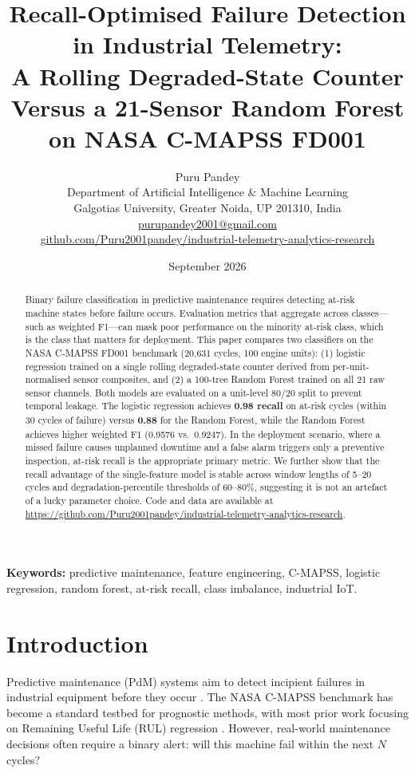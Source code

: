 \documentclass[10pt,twocolumn]{article}
\title{\textbf{Recall-Optimised Failure Detection in Industrial Telemetry:}\\
\textbf{A Rolling Degraded-State Counter Versus a 21-Sensor Random Forest}\\
\textbf{on NASA C-MAPSS FD001}}
\author{Puru Pandey\\
\small Department of Artificial Intelligence \& Machine Learning\\
\small Galgotias University, Greater Noida, UP 201310, India\\
\small \href{mailto:purupandey2001@gmail.com}{purupandey2001@gmail.com}\\
\small \href{https://github.com/Puru2001pandey/industrial-telemetry-analytics-research}{github.com/Puru2001pandey/industrial-telemetry-analytics-research}}
\date{September 2026}
\begin{document}
\maketitle
\thispagestyle{fancy}

\begin{abstract}
Binary failure classification in predictive maintenance requires detecting at-risk
machine states before failure occurs.
Evaluation metrics that aggregate across classes---such as weighted F1---can mask poor
performance on the minority at-risk class, which is the class that matters for
deployment.
This paper compares two classifiers on the NASA C-MAPSS FD001 benchmark (20,631 cycles,
100 engine units): (1) logistic regression trained on a single rolling degraded-state
counter derived from per-unit-normalised sensor composites, and (2) a 100-tree Random
Forest trained on all 21 raw sensor channels.
Both models are evaluated on a unit-level 80/20 split to prevent temporal leakage.
The logistic regression achieves \textbf{0.98 recall} on at-risk cycles (within 30
cycles of failure) versus \textbf{0.88} for the Random Forest, while the Random Forest
achieves higher weighted F1 (0.9576 vs.\ 0.9247).
In the deployment scenario, where a missed failure causes unplanned downtime and a
false alarm triggers only a preventive inspection, at-risk recall is the appropriate
primary metric.
We further show that the recall advantage of the single-feature model is stable across
window lengths of 5--20 cycles and degradation-percentile thresholds of 60--80\%,
suggesting it is not an artefact of a lucky parameter choice.
Code and data are available at
\url{https://github.com/Puru2001pandey/industrial-telemetry-analytics-research}.
\end{abstract}

\noindent\textbf{Keywords:} predictive maintenance, feature engineering, C-MAPSS,
logistic regression, random forest, at-risk recall, class imbalance, industrial IoT.

\section{Introduction}
\label{sec:intro}

Predictive maintenance (PdM) systems aim to detect incipient failures in industrial
equipment before they occur \cite{jardine2006review}.
The NASA C-MAPSS benchmark \cite{saxena2008damage} has become a standard testbed for
prognostic methods, with most prior work focusing on Remaining Useful Life (RUL)
regression \cite{li2018remaining,wu2021temporal}.
However, real-world maintenance decisions often require a binary alert: will this
machine fail within the next $N$ cycles?
\end{document}
